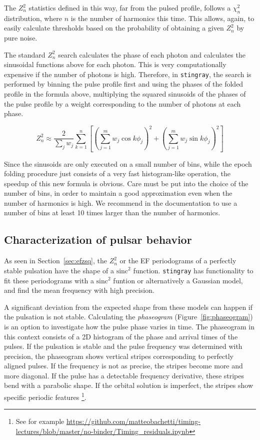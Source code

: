 \documentclass[twocolumn]{aastex62}
\newcommand{\zsq}{\ensuremath{Z^2_n}\xspace}
\newcommand{\stingray}{\texttt{stingray}\xspace}
\begin{document}
The \zsq statistics defined in this way, far from the pulsed profile, follows a $\chi^2_n$ distribution, where $n$ is the number of harmonics this time.
This allows, again, to easily calculate thresholds based on the probability of obtaining a given \zsq by pure noise.

The standard \zsq search calculates the phase of each photon and calculates the sinusoidal functions above for each photon.
This is very computationally expensive if the number of photons is high. 
Therefore, in \stingray, the search is performed by binning the pulse profile first and using the phases of the folded profile in the formula above, multiplying the squared sinusoids of the phases of the pulse profile by a weight corresponding to the number of photons at each phase.

\begin{equation}
\zsq \approx \dfrac{2}{\sum_j{w_j}} \sum_{k=1}^n \left[{\left(\sum_{j=1}^m w_j \cos k \phi_j\right)}^2 + {\left(\sum_{j=1}^m w_j \sin k \phi_j\right)}^2\right]
\end{equation}

Since the sinusoids are only executed on a small number of bins, while the epoch folding procedure just consists of a very fast histogram-like operation, the speedup of this new formula is obvious. 
Care must be put into the choice of the number of bins, in order to maintain a good approximation even when the number of harmonics is high. 
We recommend in the documentation to use a number of bins at least 10 times larger than the number of harmonics.

\subsection{Characterization of pulsar behavior}
\label{sec:ephem}
As seen in Section~\ref{sec:efzsq}, the \zsq or the EF periodograms of a perfectly stable pulsation have the shape of a $\mathrm{sinc}^2$ function.
\stingray has functionality to fit these periodograms with a $\mathrm{sinc}^2$ funtion or alternatively a Gaussian model, and find the mean frequency with high precision.

A significant deviation from the expected shape from these models can happen if the pulsation is not stable.
Calculating the \textit{phaseogram} (Figure~\ref{fig:phaseogram}) is an option to investigate how the pulse phase varies in time.
The phaseogram in this context consists of a 2D histogram of the phase and arrival times of the pulses. 
If the pulsation is stable and the pulse frequency was determined with precision, the phaseogram shows vertical stripes corresponding to perfectly aligned pulses.
If the frequency is not as precise, the stripes become more and more diagonal.
If the pulse has a detectable frequency derivative, these stripes bend with a parabolic shape.
If the orbital solution is imperfect, the stripes show specific periodic features \footnote{See for example \url{https://github.com/matteobachetti/timing-lectures/blob/master/no-binder/Timing_residuals.ipynb}}.
\end{document}
